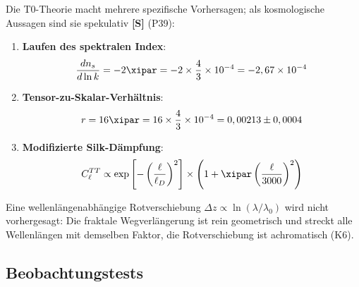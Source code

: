 	Die T0-Theorie macht mehrere spezifische Vorhersagen; als kosmologische Aussagen sind sie spekulativ \textbf{[S]} (P39):
	
	\begin{enumerate}
		\item \textbf{Laufen des spektralen Index}:
		\begin{equation}
			\frac{dn_s}{d\ln k} = -2\xipar = -2 \times \frac{4}{3} \times 10^{-4} = -2,67 \times 10^{-4}
		\end{equation}
		
		\item \textbf{Tensor-zu-Skalar-Verhältnis}:
		\begin{equation}
			r = 16\xipar = 16 \times \frac{4}{3} \times 10^{-4} = 0,00213 \pm 0,0004
		\end{equation}
		
		\item \textbf{Modifizierte Silk-Dämpfung}:
		\begin{equation}
			C_\ell^{TT} \propto \exp\left[-\left(\frac{\ell}{\ell_D}\right)^2\right] \times \left(1 + \xipar \left(\frac{\ell}{3000}\right)^2\right)
		\end{equation}
	\end{enumerate}
	
	Eine wellenlängenabhängige Rotverschiebung $\Delta z \propto \ln(\lambda/\lambda_0)$ wird nicht vorhergesagt: Die fraktale Wegverlängerung ist rein geometrisch und streckt alle Wellenlängen mit demselben Faktor, die Rotverschiebung ist achromatisch (K6).
	
	\subsection{Beobachtungstests}
	
	\begin{table}[htbp]
		\centering
		\caption{T0-Vorhersagen vs Beobachtungen}
	\end{table}
	
